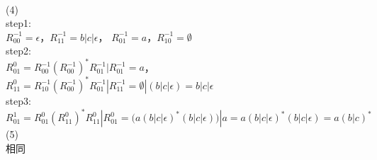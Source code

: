 \documentclass[a4paper, justified]{tufte-handout}
\begin{document}
\begin{solution}
\\
(4)\\
step1:\\
$R_{00}^{-1}=\epsilon$，$R_{11}^{-1}=b|c|\epsilon$，
$R_{01}^{-1}=a$，$R_{10}^{-1}=\emptyset$\\
step2:\\
$R_{01}^{0}=R_{00}^{-1}(R_{00}^{-1})^*R_{01}^{-1}|R_{01}^{-1}=a$，
$R_{11}^{0}=R_{10}^{-1}(R_{00}^{-1})^*R_{01}^{-1}|R_{11}^{-1}=\emptyset|(b|c|\epsilon)=b|c|\epsilon$\\
step3:\\
  $R_{01}^{1} =R_{01}^{0}(R_{11}^{0})^*R_{11}^{0}|R_{01}^{0}=
\Big( a(b|c|\epsilon)^*(b|c|\epsilon) \Big)|a = a(b|c|\epsilon)^*(b|c|\epsilon)=a(b|c)^*$\\
(5)\\
相同

\end{solution}




\end{document}
